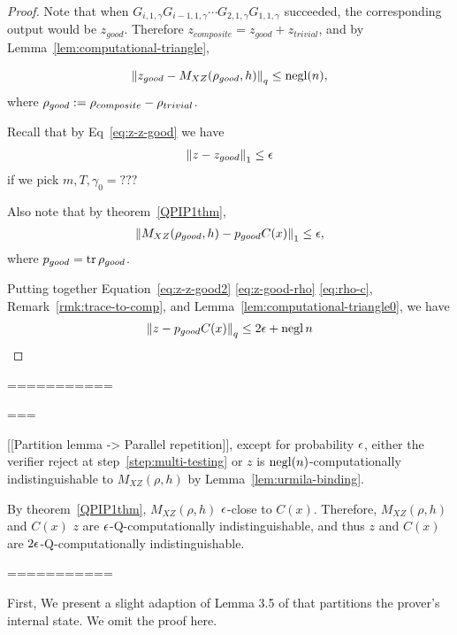 \begin{proof}
Note that when $G_{i,1,\gamma}G_{i-1,1,\gamma} \cdots G_{2,1,\gamma}G_{1,1,\gamma}$ succeeded, the corresponding output would be $z_{good}$. Therefore $z_{composite}=z_{good}+z_{trivial}$, and by Lemma~\ref{lem:computational-triangle},  

\begin{align} \label{eq:z-good-rho}
    \left\lVert z_{good} - M_{XZ}(\rho_{good},h) \right\rVert_q \leq \operatorname{negl}(n), 
\end{align}
where $\rho_{good} := \rho_{composite}-\rho_{trivial}$.

Recall that by Eq~\ref{eq:z-z-good} we have
\begin{align} \label{eq:z-z-good2}
    \left\lVert z-z_{good}\right\rVert_1 \leq \epsilon
\end{align}
if we pick $m,T,\gamma_0=???$ 

Also note that by theorem~\ref{QPIP1thm}, 
\begin{align} \label{eq:rho-c}
    \left\lVert M_{XZ}(\rho_{good},h) -p_{good} C(x)\right\rVert_1 \leq \epsilon, 
\end{align}
where $p_{good} = \operatorname{tr} \rho_{good}$.

Putting together Equation~\ref{eq:z-z-good2} \ref{eq:z-good-rho} \ref{eq:rho-c},  Remark~\ref{rmk:trace-to-comp}, and Lemma~\ref{lem:computational-triangle0}, we have  
\begin{align}
    \left\lVert z- p_{good}C(x)\right\rVert_q \leq 2\epsilon +\operatorname{negl}{n}
\end{align}


 
\end{proof}

===========

===

 [[Partition lemma ->  Parallel repetition]], except for probability $\epsilon$, either the verifier reject at step~\ref{step:multi-testing} or $z$ is $\operatorname{negl}(n)$-computationally indistinguishable to $M_{XZ}(\rho,h)$ by Lemma~\ref{lem:urmila-binding}. 
 
 By theorem~\ref{QPIP1thm}, $M_{XZ}(\rho,h)$  $\epsilon$-close to $C(x)$. Therefore, $M_{XZ}(\rho,h)$  and  $C(x)$ $z$ are $\epsilon$-Q-computationally indistinguishable, and thus $z$ and $C(x)$ are  $2\epsilon$-Q-computationally indistinguishable.
 
===========



First, We present a slight adaption of Lemma 3.5 of \cite{parallelrep}  that partitions the prover's internal state. We omit the proof here.


